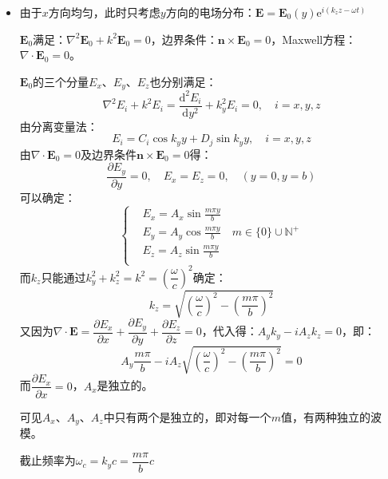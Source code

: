\documentclass[a4paper,fontset=none]{ctexart}
\begin{document}
\begin{itemize}
    \item[14.]
    由于$x$方向均匀，此时只考虑$y$方向的电场分布：$\bm{E}=\bm{E}_0(y)\mathrm{e}^{i(k_z z-\omega t)}$

    $\bm{E}_0$满足：$\nabla^2\bm{E}_0+k^2\bm{E}_0=0$，边界条件：$\bm{n}\times\bm{E}_0=0$，Maxwell方程：$\nabla\cdot\bm{E}_0=0$。

    $\bm{E}_0$的三个分量$E_x$、$E_y$、$E_z$也分别满足：
    \[
        \nabla^2E_i + k^2E_i = \frac{\mathrm{d}^2E_i}{\mathrm{d}y^2} + k_y^2E_i = 0,\quad i = x,y,z
    \]
    由分离变量法：
    \[
        E_i = C_i\cos k_y y + D_j\sin k_y y,\quad i = x,y,z
    \]
    由$\nabla\cdot\bm{E}_0=0$及边界条件$\bm{n}\times\bm{E}_0=0$得：
    \[
        \frac{\partial E_y}{\partial y} = 0,\quad E_x = E_z = 0,\quad (y=0,y=b)
    \]
    可以确定：
    \[
        \left\{
        \begin{aligned}
            & E_x = A_x\sin\frac{m\pi y}{b} \\
            & E_y = A_y\cos\frac{m\pi y}{b}\quad m\in\{0\}\cup\mathbb{N}^+ \\
            & E_z = A_z\sin\frac{m\pi y}{b} \\
        \end{aligned}
        \right.
    \]
    而$k_z$只能通过$k_y^2+k_z^2=k^2=\left(\dfrac{\omega}{c}\right)^2$确定：
    \[
        k_z=\sqrt{\left(\frac{\omega}{c}\right)^2-\left(\frac{m\pi}{b}\right)^2}
    \]
    又因为$\nabla\cdot\bm{E}=\dfrac{\partial E_x}{\partial x}+\dfrac{\partial E_y}{\partial y}+\dfrac{\partial E_z}{\partial z}=0$，代入得：$A_y k_y - iA_z k_z=0$，即：
    \[
        A_y\frac{m\pi}{b} - iA_z\sqrt{\left(\frac{\omega}{c}\right)^2-\left(\frac{m\pi}{b}\right)^2} = 0
    \]
    而$\dfrac{\partial E_x}{\partial x}=0$，$A_x$是独立的。

    可见$A_x$、$A_y$、$A_z$中只有两个是独立的，即对每一个$m$值，有两种独立的波模。

    截止频率为$\omega_c=k_y c=\dfrac{m\pi}{b}c$


\end{itemize}
\end{document}
